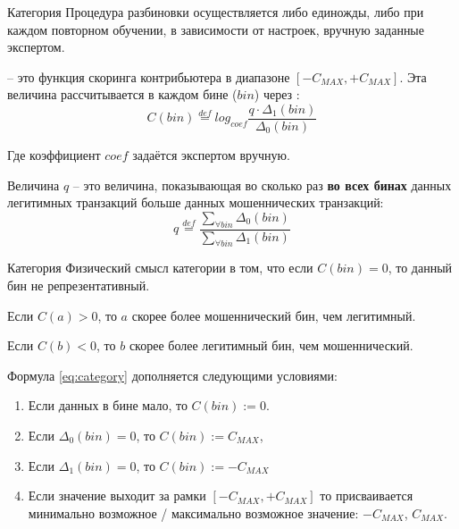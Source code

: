 \begin{frame}
	\Large
\end{frame}

\begin{frame}{Категория}
	\footnotesize
	Процедура разбиновки осуществляется либо единожды, либо при каждом повторном обучении,
	в зависимости от настроек, вручную заданные экспертом.
	
	 -- это функция скоринга контрибьютера в диапазоне $[- C_{MAX}, + C_{MAX}]$. 
	Эта величина рассчитывается в каждом бине ($bin$) через :
	\begin{equation}\label{eq:category}
	C(bin) \stackrel{def}{=} log_{coef} \frac{q \cdot \Delta_1 (bin)}{\Delta_0 (bin)}
	\end{equation}
	
	Где коэффициент $coef$ задаётся экспертом вручную.
	
	Величина $q$ -- это величина, показывающая во сколько раз \textbf{во всех бинах} данных легитимных транзакций
	 больше данных мошеннических транзакций:
	\begin{equation}
	q \stackrel{def}{=} \frac{\sum_{\forall bin} \Delta_0(bin)}{\sum_{\forall bin} \Delta_1(bin)}
	\end{equation}
\end{frame}

\begin{frame}{Категория}
	\small
	Физический смысл категории в том, что если $C(bin)=0$, то данный бин не репрезентативный.
	
	Если $C(a)>0$, то $a$ скорее более мошеннический бин, чем легитимный.
	
	Если $C(b)<0$, то $b$ скорее более легитимный бин, чем мошеннический.
	
	Формула \eqref{eq:category} дополняется следующими условиями:
	\begin{enumerate}
		\item Если данных в бине мало, то $C(bin) := 0$.
		\item Если $\Delta_0 (bin) = 0$, то $C(bin) := C_{MAX} $,
		\item Если $\Delta_1 (bin) = 0$, то $C(bin) := -C_{MAX} $
		\item Если значение выходит за рамки $[-C_{MAX}, + C_{MAX}]$
		то присваивается минимально возможное / максимально возможное  значение: $-C_{MAX}$, $C_{MAX}$.
	\end{enumerate}
\end{frame}

